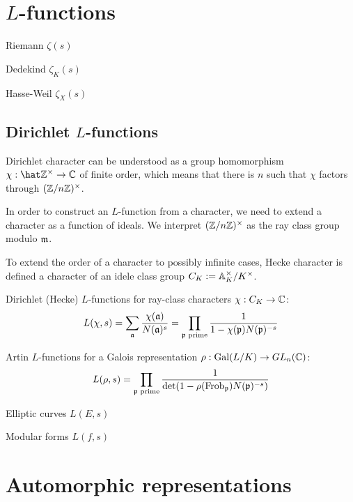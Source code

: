 \documentclass{../note}
\DeclareMathOperator{\Frob}{Frob}
\begin{document}
\chapter{$L$-functions}
Riemann $\zeta(s)$

Dedekind $\zeta_K(s)$

Hasse-Weil $\zeta_X(s)$

\section{Dirichlet $L$-functions}

\begin{prb}
Dirichlet character can be understood as a group homomorphism $\chi:\hat\Z^\times\to\C$ of finite order, which means that there is $n$ such that $\chi$ factors through $(\mathbb{Z}/n\mathbb{Z})^\times$.

In order to construct an $L$-function from a character, we need to extend a character as a function of ideals.
We interpret $(\mathbb{Z}/n\mathbb{Z})^\times$ as the ray class group modulo $\mathfrak{m}$.

To extend the order of a character to possibly infinite cases, Hecke character is defined a character of an idele class group $C_K:=\mathbb{A}_K^\times/K^\times$.
\end{prb}


Dirichlet (Hecke) $L$-functions for ray-class characters $\chi:C_K\to\mathbb{C}$:
\[L(\chi,s)=\sum_{\mathfrak{a}}\frac{\chi(\mathfrak{a})}{N(\mathfrak{a})^s}=\prod_{\mathfrak{p}\text{ prime}}\frac1{1-\chi(\mathfrak{p})N(\mathfrak{p})^{-s}}\]

Artin $L$-functions for a Galois representation $\rho:\operatorname{Gal}(L/K)\to GL_n(\mathbb{C})$:
\[L(\rho,s)=\prod_{\fp\text{ prime}}\frac1{\det(1-\rho(\Frob_\fp)N(\fp)^{-s})}\]

Elliptic curves $L(E,s)$

Modular forms $L(f,s)$


\chapter{Automorphic representations}
\end{document}

